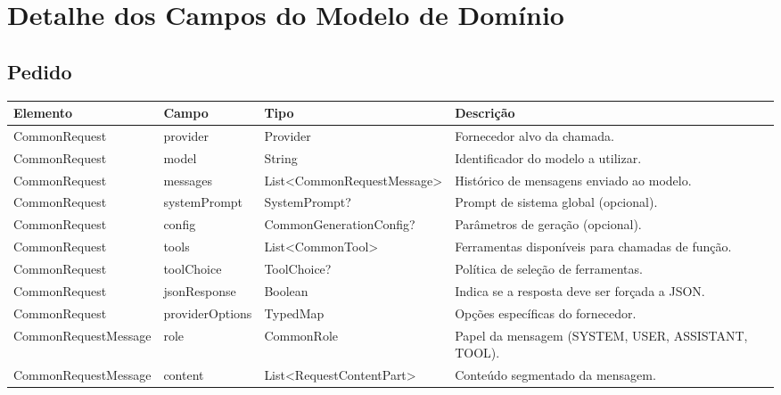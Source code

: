 \chapter{Detalhe dos Campos do Modelo de Domínio}
\label{apendice:dominio}

\section{Pedido}

\begin{table}[H]
    \centering
    \scriptsize %
    \setlength{\tabcolsep}{3.5pt} %
    \renewcommand{\arraystretch}{1.15}
    \begin{tabularx}{\textwidth}{|>{\raggedright\arraybackslash}p{2.9cm}|>{\raggedright\arraybackslash}p{2.6cm}|>{\raggedright\arraybackslash}p{2.6cm}|>{\raggedright\arraybackslash}X|}
    \hline
    \textbf{Elemento} & \textbf{Campo} & \textbf{Tipo} & \textbf{Descrição} \\ \hline

    CommonRequest & provider & Provider & Fornecedor alvo da chamada. \\ \hline
    CommonRequest & model & String & Identificador do modelo a utilizar. \\ \hline
    CommonRequest & messages & List<Common\-RequestMessage> & Histórico de mensagens enviado ao modelo. \\ \hline
    CommonRequest & systemPrompt & SystemPrompt? & Prompt de sistema global (opcional). \\ \hline
    CommonRequest & config & Common\-GenerationConfig? & Parâmetros de geração (opcional). \\ \hline
    CommonRequest & tools & List<CommonTool> & Ferramentas disponíveis para chamadas de função. \\ \hline
    CommonRequest & toolChoice & ToolChoice? & Política de seleção de ferramentas. \\ \hline
    CommonRequest & jsonResponse & Boolean & Indica se a resposta deve ser forçada a JSON. \\ \hline
    CommonRequest & providerOptions & TypedMap & Opções específicas do fornecedor. \\ \hline

    CommonRequest\-Message & role & CommonRole & Papel da mensagem (SYSTEM, USER, ASSISTANT, TOOL). \\ \hline
    CommonRequest\-Message & content & List<Request\-ContentPart> & Conteúdo segmentado da mensagem. \\ \hline


\end{tabularx}
\end{table}
